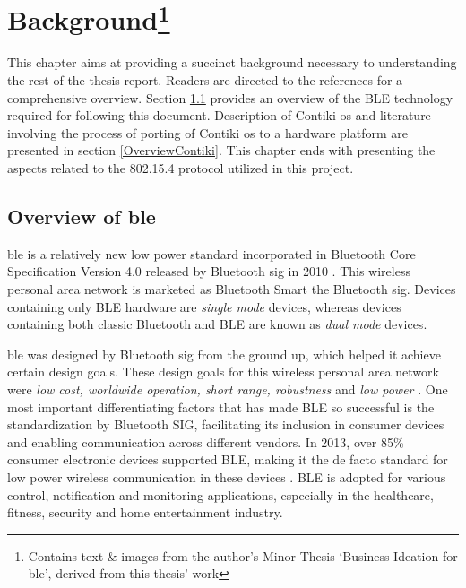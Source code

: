 \chapter[Background]{Background\footnote{Contains text \& images from the author's Minor Thesis `Business Ideation for \gls{ble}', derived from this thesis' work}} \label{2Back}

This chapter aims at providing a succinct background necessary to understanding the rest of the thesis report. Readers are directed to the references for a comprehensive overview. Section \ref{OverviewBLE} provides an overview of the BLE technology required for following this document. Description of Contiki \gls{os} and literature involving the process of porting of Contiki \gls{os} to a hardware platform are presented in section \ref{OverviewContiki}. This chapter ends with presenting the aspects related to the 802.15.4 protocol utilized in this project.


\section{Overview of \texorpdfstring{\acrlong{ble}}{Bluetooth Low Energy}} \label{OverviewBLE}

\acrfull{ble} is a relatively new low power standard incorporated in Bluetooth Core Specification Version 4.0 released by Bluetooth \gls{sig} in 2010 \cite{CoreSpec4.0}. This wireless personal area network is marketed as Bluetooth Smart the Bluetooth \gls{sig}. Devices containing only BLE hardware are \emph{single mode} devices, whereas devices containing both classic Bluetooth and BLE are known as \emph{dual mode} devices.   

\gls{ble} was designed by Bluetooth \gls{sig} from the ground up, which helped it achieve certain design goals. These design goals for this wireless personal area network were \emph{low cost, worldwide operation, short range, robustness} and \emph{low power} \cite{Heydon2012}. One most important differentiating factors that has made BLE so successful is the standardization by Bluetooth SIG, facilitating its inclusion in consumer devices and enabling communication across different vendors. In 2013, over 85\% consumer electronic devices supported BLE, making it the de facto standard for low power wireless communication in these devices \cite{Martin2014}. BLE is adopted for various control, notification and monitoring applications, especially in the healthcare, fitness, security and home entertainment industry. 

